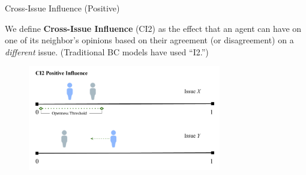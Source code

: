 \documentclass[12pt]{beamer}
\begin{document}
\begin{frame}[c]{Cross-Issue Influence (Positive)}  %

We define \textbf{Cross-Issue Influence} (CI2) as the effect that an agent can
have on one of its neighbor's opinions based on their agreement (or
disagreement) on a \textit{different} issue. (Traditional BC models have used
``I2.'')

\pause
\begin{figure}
	\includegraphics[width=0.75\textwidth]{images/CI2Positive.png}
\end{figure}

\end{frame}
\end{document}
